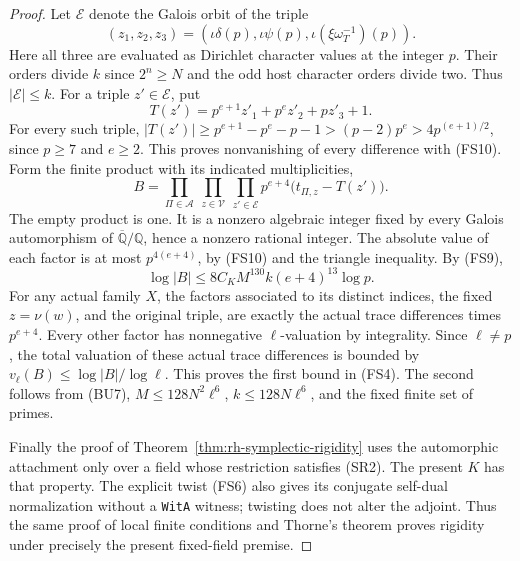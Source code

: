 \begin{proof}
Let \(\mathcal E\) denote the Galois orbit of the triple
\[
       (z_1,z_2,z_3)=
       (\iota\delta(p),\iota\psi(p),
                         \iota(\xi\omega_T^{-1})(p)).
\]
Here all three are evaluated as Dirichlet character
values at the integer \(p\). Their orders divide \(k\)
since \(2^n\ge N\) and the odd host character orders
divide two. Thus \(|\mathcal E|\le k\).
For a triple \(z'\in\mathcal E\), put
\[
                   T(z')=p^{e+1}z'_1+p^ez'_2+pz'_3+1 .
\]
For every such triple, \(|T(z')|\ge
p^{e+1}-p^e-p-1>(p-2)p^e>4p^{(e+1)/2}\), since
\(p\ge7\) and \(e\ge2\). This proves nonvanishing
of every difference with (FS10).
Form the finite product with its indicated multiplicities,
\[
 B=\prod_{\Pi\in\mathcal A}\ \prod_{z\in\mathcal V}\
      \prod_{z'\in\mathcal E}
            p^{e+4}\bigl(t_{\Pi,z}-T(z')\bigr).
                                                               \tag{FS11}
\]
The empty product is one.
It is a nonzero algebraic integer fixed by every
Galois automorphism of \(\overline{\mathbb Q}/\mathbb Q\),
hence a nonzero rational integer. The absolute value
of each factor is at most \(p^{4(e+4)}\), by (FS10) and
the triangle inequality. By (FS9),
\[
        \log|B|\le 8C_K M^{130} k(e+4)^{13}\log p.
\]
For any actual family \(X\), the factors associated to
its distinct indices, the fixed \(z=\nu(w)\), and the
original triple, are exactly the actual trace differences
times \(p^{e+4}\). Every other factor has nonnegative
\(\ell\)-valuation by integrality. Since \(\ell\ne p\),
the total valuation of these actual trace differences
is bounded by \(v_\ell(B)\le\log|B|/\log\ell\).
This proves the first bound in (FS4). The second follows
from (BU7), \(M\le128 N^2\ell^6\),
\(k\le128N\ell^6\), and the fixed finite set of primes.

Finally the proof of Theorem~\ref{thm:rh-symplectic-rigidity}
uses the automorphic attachment only over a field whose
restriction satisfies (SR2). The present \(K\) has that
property. The explicit twist (FS6) also gives its
conjugate self-dual normalization without a
\texttt{WitA} witness; twisting does not alter the
adjoint. Thus the same proof of local finite conditions
and Thorne's theorem proves rigidity under precisely
the present fixed-field premise.
\end{proof}


